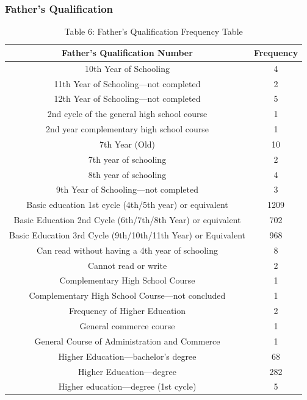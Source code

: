 \documentclass[
]{article}
\begin{document}
\hypertarget{fathers-qualification}{%
\subsubsection{Father's Qualification}\label{fathers-qualification}}

\begin{table}

\caption{\label{tab:unnamed-chunk-11}Table 6: Father's Qualification Frequency Table}
\centering
\begin{tabular}[t]{c|c}
\hline
Father's Qualification Number & Frequency\\
\hline
10th Year of Schooling & 4\\
\hline
11th Year of Schooling—not completed & 2\\
\hline
12th Year of Schooling—not completed & 5\\
\hline
2nd cycle of the general high school course & 1\\
\hline
2nd year complementary high school course & 1\\
\hline
7th Year (Old) & 10\\
\hline
7th year of schooling & 2\\
\hline
8th year of schooling & 4\\
\hline
9th Year of Schooling—not completed & 3\\
\hline
Basic education 1st cycle (4th/5th year) or equivalent & 1209\\
\hline
Basic Education 2nd Cycle (6th/7th/8th Year) or equivalent & 702\\
\hline
Basic Education 3rd Cycle (9th/10th/11th Year) or Equivalent & 968\\
\hline
Can read without having a 4th year of schooling & 8\\
\hline
Cannot read or write & 2\\
\hline
Complementary High School Course & 1\\
\hline
Complementary High School Course—not concluded & 1\\
\hline
Frequency of Higher Education & 2\\
\hline
General commerce course & 1\\
\hline
General Course of Administration and Commerce & 1\\
\hline
Higher Education—bachelor’s degree & 68\\
\hline
Higher Education—degree & 282\\
\hline
Higher education—degree (1st cycle) & 5\\

\end{tabular}
\end{table}
\end{document}
